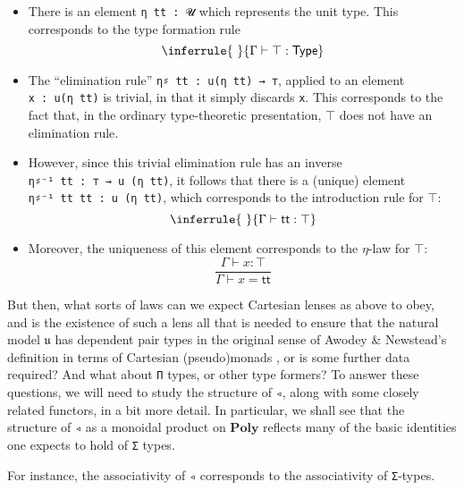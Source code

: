 \documentclass[
  11pt,
  oneside,
  article]{memoir}
\providecommand{\tightlist}{%
  \setlength{\itemsep}{0pt}\setlength{\parskip}{0pt}}
\theoremstyle{definition}
\theoremstyle{plain}
\newcommand{\0}{\textsf{0}}
\newcommand{\1}{\tn{\textsf{1}}}
\begin{document}
\begin{itemize}
\tightlist
\item
  There is an element \texttt{η\ tt\ :\ 𝓤} which represents the unit
  type. This corresponds to the type formation rule
  \[ \inferrule{~}{\Gamma \vdash \top : \mathsf{Type}}\]
\item
  The ``elimination rule'' \texttt{η♯\ tt\ :\ u(η\ tt)\ →\ ⊤}, applied
  to an element \texttt{x\ :\ u(η\ tt)} is trivial, in that it simply
  discards \texttt{x}. This corresponds to the fact that, in the
  ordinary type-theoretic presentation, \(\top\) does not have an
  elimination rule.
\item
  However, since this trivial elimination rule has an inverse
  \texttt{η♯⁻¹\ tt\ :\ ⊤\ →\ u\ (η\ tt)}, it follows that there is a
  (unique) element \texttt{η♯⁻¹\ tt\ tt\ :\ u\ (η\ tt)}, which
  corresponds to the introduction rule for \(\top\):
  \[\inferrule{~}{\Gamma \vdash \mathsf{tt} : \top}\]
\item
  Moreover, the uniqueness of this element corresponds to the
  \(\eta\)-law for \(\top\):
  \[\frac{\Gamma \vdash x : \top}{\Gamma \vdash x = \mathsf{tt}}\]
\end{itemize}

But then, what sorts of laws can we expect Cartesian lenses as above to
obey, and is the existence of such a lens all that is needed to ensure
that the natural model \(𝔲\) has dependent pair types in the original
sense of Awodey \& Newstead's definition in terms of Cartesian
(pseudo)monads \cite{awodey2014natural,awodey2018polynomial}, or is some
further data required? And what about \texttt{Π} types, or other type
formers? To answer these questions, we will need to study the structure
of \texttt{◃}, along with some closely related functors, in a bit more
detail. In particular, we shall see that the structure of \texttt{◃} as
a monoidal product on \(\mathbf{Poly}\) reflects many of the basic
identities one expects to hold of \texttt{Σ} types.

For instance, the associativity of \texttt{◃} corresponds to the
associativity of \texttt{Σ}-types.
\end{document}
